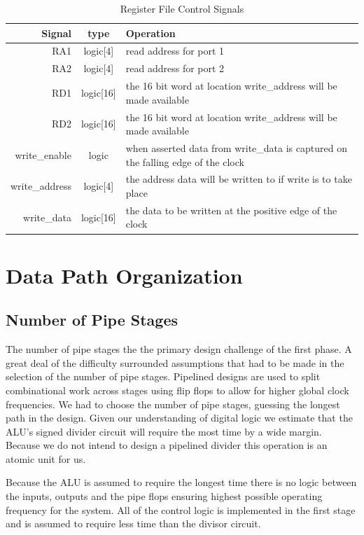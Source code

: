     \begin{table}[H]
        \caption{Register File Control Signals}
        \label{regfile}
        \centering
        \begin{tabular}{r c p{5cm}}
        Signal         & type      & Operation\\
        \hline
        RA1            & logic[4]  & read address for port 1\\
        RA2            & logic[4]  & read address for port 2\\
        RD1            & logic[16] & the 16 bit word at location write\_address will be made available\\
        RD2            & logic[16] & the 16 bit word at location write\_address will be made available\\
        write\_enable  & logic     & when asserted data from write\_data is captured on the falling edge of the clock \\
        write\_address & logic[4]  & the address data will be written to if write is to take place \\
        write\_data    & logic[16] & the data to be written at the positive edge of the clock \\
        \end{tabular}
    \end{table}

\section{Data Path Organization}
    \subsection{Number of Pipe Stages}
    The number of pipe stages the the primary design challenge of the first phase. A great deal of the difficulty surrounded assumptions that had to be made in the selection of the number of pipe stages. Pipelined designs are used to split combinational work across stages using flip flops to allow for higher global clock frequencies. We had to choose the number of pipe stages, guessing the longest path in the design. Given our understanding of digital logic we estimate that the ALU's signed divider circuit will require the most time by a wide margin. Because we do not intend to design a pipelined divider this operation is an atomic unit for us. 

    Because the ALU is assumed to require the longest time there is no logic between the inputs, outputs and the pipe flops ensuring highest possible operating frequency for the system. All of the control logic is implemented in the first stage and is assumed to require less time than the divisor circuit. 
    
